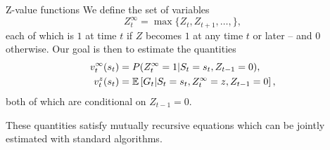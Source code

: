 
\begin{frame}{Z-value functions}
We define the set of variables
\begin{equation*}
	Z_t^\infty = \max\{Z_t,Z_{t+1}, \dots,\}, %
\end{equation*}
each of which is $1$ at time $t$ if $Z$ becomes $1$ at any time $t$ or later -- and $0$ otherwise.
Our goal is then to estimate the quantities
\begin{align*}
	v^{\infty}_t(s_t) & = P(Z^\infty_t =1 | S_t=s_t, Z_{t-1} = 0), \\
	v^{z}_t(s_t) & = \E\left[G_t | S_t=s_t, Z_t^\infty = z, Z_{t-1} = 0\right],  %
\end{align*}
both of which are conditional on $Z_{t-1} = 0$.

These quantities satisfy mutually recursive equations which can be jointly estimated with standard algorithms.
\end{frame}


